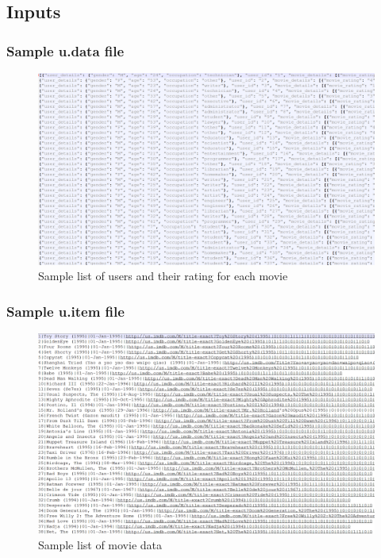 \subsection{Inputs}
\subsubsection{Sample u.data file}
\begin{figure}[ht]    
    \begin{center}
        \includegraphics[scale=0.4]{sample_udata.png}
        \caption{Sample list of users and their rating for each movie}
        \label{Sample3t1}
    \end{center}
\end{figure}
\newpage
\subsubsection{Sample u.item file}
\begin{figure}[ht]    
    \begin{center}
        \includegraphics[scale=0.4]{sample_uitem.png}
        \caption{Sample list of movie data}
        \label{Sample3t2}
    \end{center}
\end{figure}
\newpage
